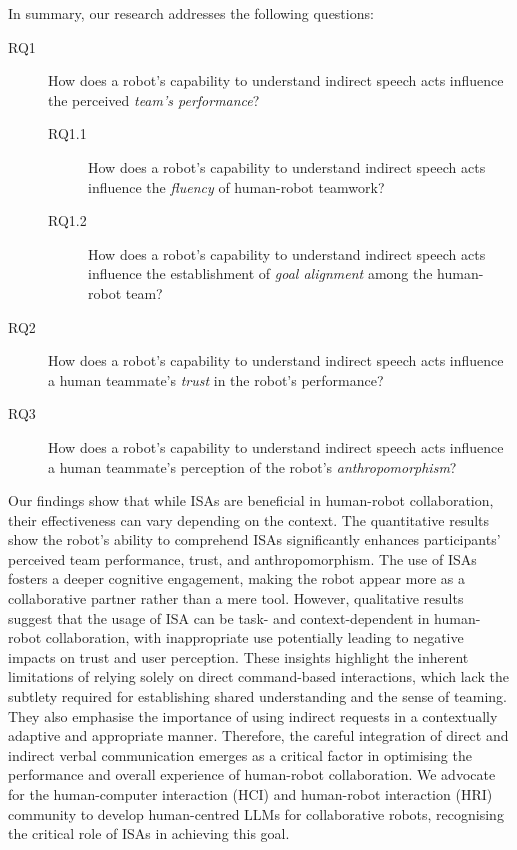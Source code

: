 In summary, our research addresses the following questions:
\begin{description}
    \item [RQ1] How does a robot's capability to understand indirect speech acts influence the perceived \textit{team's performance}?
    \begin{description}
        \item [RQ1.1] How does a robot's capability to understand indirect speech acts influence the \textit{fluency} of human-robot teamwork?
        \item [RQ1.2] How does a robot's capability to understand indirect speech acts influence the establishment of \textit{goal alignment} among the human-robot team?
    \end{description}
    \item [RQ2] How does a robot's capability to understand indirect speech acts influence a human teammate's \textit{trust} in the robot's performance?
    \item [RQ3] How does a robot's capability to understand indirect speech acts influence a human teammate's perception of the robot's \textit{anthropomorphism}?
\end{description}

Our findings show that while ISAs are beneficial in human-robot collaboration, their effectiveness can vary depending on the context. The quantitative results show the robot's ability to comprehend ISAs significantly enhances participants' perceived team performance, trust, and anthropomorphism. The use of ISAs fosters a deeper cognitive engagement, making the robot appear more as a collaborative partner rather than a mere tool. However, qualitative results suggest that the usage of ISA can be task- and context-dependent in human-robot collaboration, with inappropriate use potentially leading to negative impacts on trust and user perception. These insights highlight the inherent limitations of relying solely on direct command-based interactions, which lack the subtlety required for establishing shared understanding and the sense of teaming. They also emphasise the importance of using indirect requests in a contextually adaptive and appropriate manner. Therefore, the careful integration of direct and indirect verbal communication emerges as a critical factor in optimising the performance and overall experience of human-robot collaboration. We advocate for the human-computer interaction (HCI) and human-robot interaction (HRI) community to develop human-centred LLMs for collaborative robots, recognising the critical role of ISAs in achieving this goal.